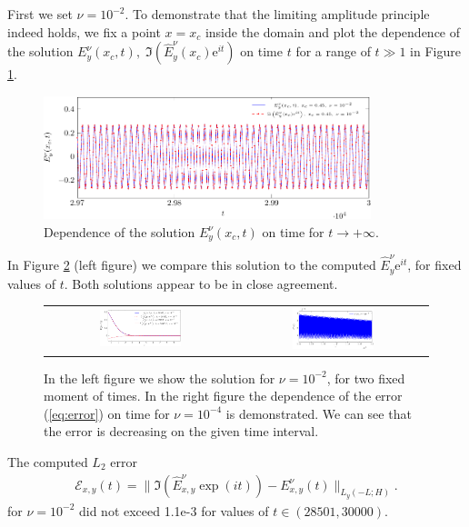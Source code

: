 First we set $\nu=10^{-2}$. To demonstrate that the limiting amplitude principle indeed holds, we fix a point $x=x_c$ 
inside the domain and plot the dependence of the solution $E_{y}^{\nu}(x_c,t), \; \Im\left(\hat{E}_y^{\nu}(x_c)\mathrm{e}^{it}\right)$ 
on time $t$ for a range of $t\gg 1$ in Figure \ref{fig:nu1e2_harmon}.  

\begin{figure}[htb]
\includegraphics[width=0.85\textwidth]{airy/figure_nu1e2-crop.pdf}
\caption{Dependence of the solution $E_{y}^{\nu}(x_c,t)$ on time for $t\rightarrow +\infty$.}
 \label{fig:nu1e2_harmon}
\end{figure}

In Figure \ref{fig:nu1e2_harmon2} (left figure) we compare this solution to the computed $\hat{E}_y^{\nu}\mathrm{e}^{it}$, for
fixed values of $t$. Both solutions appear to be in close agreement. 
\begin{figure}[htb]
 \begin{tabular}{cc}
\includegraphics[width=0.45\textwidth]{airy/figure_nu1e2_2-crop.pdf}
&
\includegraphics[width=0.45\textwidth]{airy/figure_error_nu1e4-crop.pdf}\\
\end{tabular}
\caption{In the left figure we show the solution for $\nu=10^{-2}$, for two fixed moment of times. In the right figure 
the dependence of the error (\ref{eq:error}) on time for $\nu=10^{-4}$ is demonstrated. 
We can see that the error is decreasing on the given time interval.}
 \label{fig:nu1e2_harmon2}
\end{figure}
\FloatBarrier
The computed $L_2$ error
\begin{align}
\label{eq:error}
\mathcal{E}_{x,y}(t)=\|\Im\left(\hat{E}_{x,y}^{\nu}\exp(it)\right)-E_{x,y}^{\nu}(t)\|_{L_{y}(-L;H)}.
\end{align}
for $\nu=10^{-2}$ did not exceed 1.1e-3 for values of $t\in \left(28501,  30000\right)$. 

